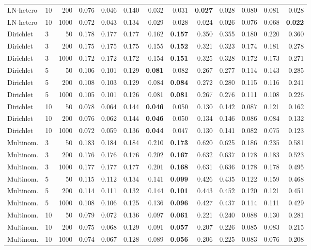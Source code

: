 \begin{tabular}{llrrrrrrrrrrr}
LN-hetero & 10 & 200 & 0.076 & 0.046 & 0.140 & 0.032 & 0.031 & \textbf{0.027} & 0.028 & 0.080 & 0.081 & 0.028 \\
LN-hetero & 10 & 1000 & 0.072 & 0.043 & 0.134 & 0.029 & 0.028 & 0.024 & 0.026 & 0.076 & 0.068 & \textbf{0.022} \\
\midrule
Dirichlet & 3 & 50 & 0.178 & 0.177 & 0.177 & 0.162 & \textbf{0.157} & 0.350 & 0.355 & 0.180 & 0.220 & 0.360 \\
Dirichlet & 3 & 200 & 0.175 & 0.175 & 0.175 & 0.155 & \textbf{0.152} & 0.321 & 0.323 & 0.174 & 0.181 & 0.278 \\
Dirichlet & 3 & 1000 & 0.172 & 0.172 & 0.172 & 0.154 & \textbf{0.151} & 0.325 & 0.328 & 0.172 & 0.173 & 0.271 \\
Dirichlet & 5 & 50 & 0.106 & 0.101 & 0.129 & \textbf{0.081} & 0.082 & 0.267 & 0.277 & 0.114 & 0.143 & 0.285 \\
Dirichlet & 5 & 200 & 0.108 & 0.103 & 0.129 & 0.084 & \textbf{0.084} & 0.272 & 0.280 & 0.115 & 0.116 & 0.241 \\
Dirichlet & 5 & 1000 & 0.105 & 0.101 & 0.126 & 0.081 & \textbf{0.081} & 0.267 & 0.276 & 0.111 & 0.108 & 0.226 \\
Dirichlet & 10 & 50 & 0.078 & 0.064 & 0.144 & \textbf{0.046} & 0.050 & 0.130 & 0.142 & 0.087 & 0.121 & 0.162 \\
Dirichlet & 10 & 200 & 0.076 & 0.062 & 0.144 & \textbf{0.046} & 0.050 & 0.134 & 0.146 & 0.086 & 0.084 & 0.132 \\
Dirichlet & 10 & 1000 & 0.072 & 0.059 & 0.136 & \textbf{0.044} & 0.047 & 0.130 & 0.141 & 0.082 & 0.075 & 0.123 \\
\midrule
Multinom. & 3 & 50 & 0.183 & 0.184 & 0.184 & 0.210 & \textbf{0.173} & 0.620 & 0.625 & 0.186 & 0.235 & 0.581 \\
Multinom. & 3 & 200 & 0.176 & 0.176 & 0.176 & 0.202 & \textbf{0.167} & 0.632 & 0.637 & 0.178 & 0.183 & 0.523 \\
Multinom. & 3 & 1000 & 0.177 & 0.177 & 0.177 & 0.201 & \textbf{0.168} & 0.631 & 0.636 & 0.178 & 0.178 & 0.495 \\
Multinom. & 5 & 50 & 0.115 & 0.112 & 0.134 & 0.141 & \textbf{0.099} & 0.426 & 0.435 & 0.122 & 0.159 & 0.468 \\
Multinom. & 5 & 200 & 0.114 & 0.111 & 0.132 & 0.144 & \textbf{0.101} & 0.443 & 0.452 & 0.120 & 0.121 & 0.451 \\
Multinom. & 5 & 1000 & 0.108 & 0.106 & 0.125 & 0.136 & \textbf{0.096} & 0.427 & 0.437 & 0.114 & 0.111 & 0.429 \\
Multinom. & 10 & 50 & 0.079 & 0.072 & 0.136 & 0.097 & \textbf{0.061} & 0.221 & 0.240 & 0.088 & 0.130 & 0.281 \\
Multinom. & 10 & 200 & 0.075 & 0.068 & 0.129 & 0.091 & \textbf{0.057} & 0.207 & 0.226 & 0.085 & 0.083 & 0.215 \\
Multinom. & 10 & 1000 & 0.074 & 0.067 & 0.128 & 0.089 & \textbf{0.056} & 0.206 & 0.225 & 0.083 & 0.076 & 0.208 \\
\bottomrule
\end{tabular}